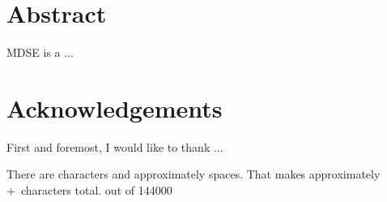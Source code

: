 \section*{Abstract}
\acrlong{MDSE} is a ...

\section*{Acknowledgements}
First and foremost, I would like to thank ...


There are \thechar characters and approximately \theword spaces.
That makes approximately \the\numexpr\theword+\thechar\relax\ characters total. out of 144000
